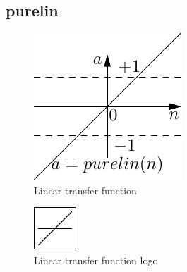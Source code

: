 \subsection{purelin}

\begin{figure}[htb]
\centering
  \includegraphics{octave/neuroPackage/graphics/purelin}
\caption{Linear transfer function}
\label{fig:purelinTransferFunction}
\end{figure}

\begin{figure}[htb]
\centering
  \includegraphics{octave/neuroPackage/graphics/purelinlogo}
\caption{Linear transfer function logo}
\label{fig:purelinTransferFunctionLogo}
\end{figure}

